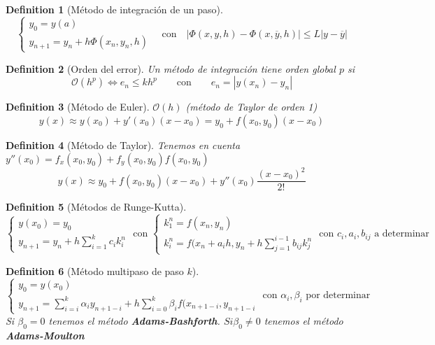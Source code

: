 \documentclass[leqno]{article}
\newtheorem*{definition}{Definition}
\begin{document}
\begin{definition}[Método de integración de un paso]
\[
\begin{cases}
  y_0=y(a)\\
  y_{n+1}= y_n + h\Phi (x_n, y_n, h)
\end{cases}
\quad \text{con} \quad |\Phi (x, y, h)-\Phi (x, \overline{y}, h)|\le L|y-\overline{y}| 
\] 
\end{definition}

\begin{definition}[Orden del error] Un método de integración tiene orden global $p$ si
  \[
  \mathcal{O}(h^p) \iff e_n \le kh^p \qquad \text{con} \qquad e_n = |y(x_n)-y_n|
  \] 
\end{definition}


\begin{definition}[Método de Euler] $\mathcal{O}(h)$ (método de Taylor de orden 1)
\[
y(x) \approx y(x_0) + y'(x_0)(x-x_0) = y_0+f(x_0,y_0)(x-x_0)
\] 
\end{definition}

\begin{definition}[Método de Taylor] Tenemos en cuenta $y''(x_0) = f_x(x_0, y_0)+ f_y(x_0, y_0)f(x_0, y_0)$
 \[
y(x) \approx y_0+ f(x_0,y_0)(x-x_0) + y''(x_0) \frac{(x-x_0)^2}{2!}
\] 
\end{definition}

\begin{definition}[Métodos de Runge-Kutta]
\[
  \begin{cases}
  y(x_0)=y_0\\
  y_{n+1} = y_n + h\sum_{i=1}^k c_ik_i^n
\end{cases} \text{ con } 
\begin{cases}
  k_1^n = f(x_n, y_n) \\
  k_i^n = f(x_n+a_ih, y_n+h\sum_{j=1}^{i-1} b_{ij}k_j^n
\end{cases} \text{ con } c_i, a_i, b_{ij} \text{ a determinar}
\]
\end{definition}

\begin{definition}[Método multipaso de paso $k$]
\[
\begin{cases}
  y_0 = y(x_0)\\
  y_{n+1}= \sum_{i=i}^k \alpha _iy_{n+1-i} + h\sum_{i=0}^k \beta _i f(x_{n+1-i}, y_{n+1-i} 
\end{cases} \text{ con } \alpha _i, \beta _i \text{ por determinar}
\] 
Si $\beta _0=0$ tenemos el método  \textbf{Adams-Bashforth}. $Si  \beta_0\neq 0$ tenemos el método  \textbf{Adams-Moulton}
\end{definition}
\end{document}
